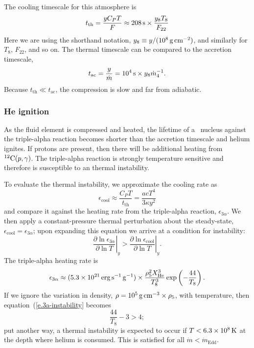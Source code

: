The cooling timescale for this atmosphere is
\[ t_{\mathrm{th}} = \frac{yC_{P} T}{F} \approx 208\,\mathrm{s} \times \frac{y_{8} T_{8}}{F_{22}} \]
Here we are using the shorthand notation, $y_{8}\equiv y/(10^{8}\,\mathrm{g}\,{\mathrm{c}\mathrm{m}}^{-2})$, and similarly for $T_{8}$, $F_{22}$, and so on.
The thermal timescale can be compared to the accretion timescale,
\[ t_{\mathrm{ac}} = \frac{y}{\dot{m}} = 10^{4}\,\mathrm{s}\times y_{8}\dot{m}_{4}^{-1}.
\]
Because $t_{\mathrm{th}}\ll t_{\mathrm{ac}}$, the compression is slow and far from adiabatic.

\subsubsection{He ignition}

As the fluid element is compressed and heated, the lifetime of a \helium\ nucleus against the triple-alpha reaction becomes shorter than the accretion timescale and helium ignites.  If protons are present, then there will be additional heating from $\mathrm{^{12}C}(p,\gamma)$.  The triple-alpha reaction is strongly temperature sensitive and therefore is susceptible to an thermal instability.

To evaluate the thermal instability, we approximate the cooling rate as
\begin{equation}\label{e.cooling-rate-approx}
\epsilon_{\mathrm{cool}} \approx \frac{C_{P}T}{t_{\mathrm{th}}} = \frac{ac T^{4}}{3\kappa y^{2}}
\end{equation}
and compare it against the heating rate from the triple-alpha reaction, $\epsilon_{3\alpha}$. We then apply a constant-pressure thermal perturbation about the steady-state, $\epsilon_{\mathrm{cool}} = \epsilon_{3\alpha}$; upon expanding this equation we arrive at a condition for instability:
\begin{equation}\label{e.3a-instability}
\left.\frac{\partial\ln\epsilon_{3\alpha}}{\partial\ln T}\right|_{y} > \left.\frac{\partial\ln\epsilon_{\mathrm{cool}}}{\partial\ln T}\right|_{y}.
\end{equation}
The triple-alpha heating rate is 
\[
	\epsilon_{3\alpha} \approx (5.3\times 10^{21}\,\mathrm{erg}\,{\mathrm{s}}^{-1}\,\mathrm{g}^{-1}) \times \frac{\rho_{5}^{2}X_{\mathrm{He}}^{3}}{T_{8}^{3}}\exp\left(-\frac{44}{T_{8}}\right).
\]
If we ignore the variation in density, $\rho = 10^{5}\,\mathrm{g}\,{\mathrm{c}\mathrm{m}}^{-3} \times \rho_{5}$, with temperature, then equation~(\ref{e.3a-instability} becomes
\begin{equation}\label{e.3a-instability-temperature}
\frac{44}{T_{8}} - 3 > 4;
\end{equation}
put another way, a thermal instability is expected to occur if $T < 6.3\times 10^{8}\,\mathrm{K}$ at the depth where helium is consumed.  This is satisfied for all $\dot{m}< \dot{m}_{\mathrm{Edd}}$.

